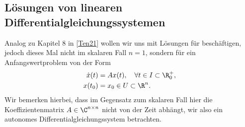 \documentclass[letterpaper,10pt,english]{jupyterBook}
\begin{document}
\subsection{Lösungen von linearen Differentialgleichungssystemen}
\label{\detokenize{ode/repetition:losungen-von-linearen-differentialgleichungssystemen}}\label{\detokenize{ode/repetition:s-lineare-dglsysteme}}
\sphinxAtStartPar
Analog zu Kapitel 8 in {[}\hyperlink{cite.references:id12}{Ten21}{]} wollen wir uns mit Lösungen für  beschäftigen, jedoch dieses Mal nicht im skalaren Fall \(n=1\), sondern für ein Anfangswertproblem von der Form
\begin{equation}\label{equation:ode/repetition:eq:linhomdglsystem}
\begin{split}\dot{x}(t) &= A x(t), \quad \forall t \in I \subset \R^+_0, \\
x(t_0) &= x_0 \in U \subset \R^n.\end{split}
\end{equation}
\sphinxAtStartPar
Wir bemerken hierbei, dass im Gegensatz zum skalaren Fall hier die Koeffizientenmatrix \(A \in \C^{n\times n}\) nicht von der Zeit abhängt, wir also ein autonomes Differentialgleichungssystem betrachten.
\end{document}
